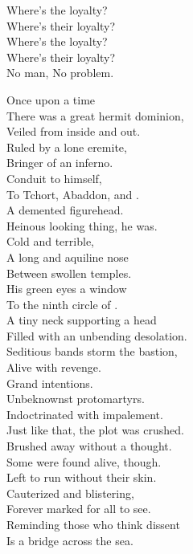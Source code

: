 Where's the loyalty? \\
Where's their loyalty? \\
Where's the loyalty? \\
Where's their loyalty? \\
No man, No problem. \\





Once upon a time \\
There was a great hermit dominion, \\
Veiled from inside and out. \\
Ruled by a lone eremite, \\
Bringer of an inferno. \\
Conduit to  himself, \\
To Tchort, Abaddon, and . \\
A demented figurehead. \\

Heinous looking thing, he was. \\
Cold and terrible, \\
A long and aquiline nose \\
Between swollen temples. \\
His green eyes a window \\
To the ninth circle of . \\
A tiny neck supporting a head \\
Filled with an unbending desolation. \\

Seditious bands storm the bastion, \\
Alive with revenge. \\
Grand intentions. \\
Unbeknownst protomartyrs. \\
Indoctrinated with impalement. \\

Just like that, the plot was crushed. \\
Brushed away without a thought. \\
Some were found alive, though. \\
Left to run without their skin. \\
Cauterized and blistering, \\
Forever marked for all to see. \\
Reminding those who think dissent \\
Is a bridge across the sea. \\

